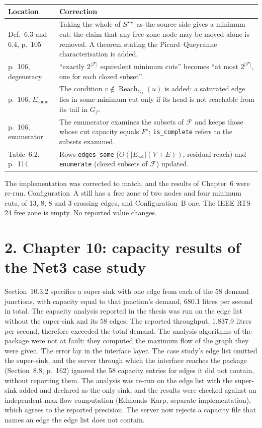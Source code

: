 \documentclass[11pt]{article}
\begin{document}
\begin{tabularx}{\linewidth}{@{}P{3.4cm}L@{}}
\toprule
Location & Correction \\
\midrule
Def.~6.3 and 6.4, p.~105 & Taking the whole of $S^{\star\star}$ as the source side gives a
minimum cut; the claim that any free-zone node may be moved alone is removed. A theorem
stating the Picard--Queyranne characterisation is added. \\
p.~106, degeneracy & ``exactly $2^{|\mathcal{F}|}$ equivalent minimum cuts'' becomes ``at most
$2^{|\mathcal{F}|}$, one for each closed subset''. \\
p.~106, $E_{\text{some}}$ & The condition $v \notin \operatorname{Reach}_{G_f}(u)$ is added: a
saturated edge lies in some minimum cut only if its head is not reachable from its tail in
$G_f$. \\
p.~106, enumerator & The enumerator examines the subsets of $\mathcal{F}$ and keeps those whose
cut capacity equals $F^\star$; \texttt{is\_complete} refers to the subsets examined. \\
Table~6.2, p.~114 & Rows \texttt{edges\_some} ($O(|E_{\text{sat}}|(V+E))$, residual reach) and
\texttt{enumerate} (closed subsets of $\mathcal{F}$) updated. \\
\bottomrule
\end{tabularx}

The implementation was corrected to match, and the results of Chapter~6 were re-run. Configuration~A still has a free zone of two nodes and four minimum
cuts, of 13, 8, 8 and 3 crossing edges, and Configuration~B one. The IEEE RTS-24 free zone is
empty. No reported value changes.

\section*{2. Chapter 10: capacity results of the Net3 case study}

Section~10.3.2 specifies a super-sink with one edge from each of the 58 demand junctions,
with capacity equal to that junction's demand, 680.1 litres per second in total. The
capacity analysis reported in the thesis was run on the edge list without the super-sink and
its 58 edges. The reported throughput, 1,837.9 litres per second, therefore exceeded the total
demand. The analysis algorithms of the package were not at fault: they computed the maximum
flow of the graph they were given. The error lay in the interface layer. The case study's
edge list omitted the super-sink, and the server through which the interface reaches the
package (Section~8.8, p.~162) ignored the 58 capacity entries for edges it did not contain,
without reporting them. The
analysis was re-run on the edge list with the super-sink added and declared as the only sink,
and the results were checked against an independent max-flow computation (Edmonds--Karp,
separate implementation), which agrees to the reported precision. The server now rejects a
capacity file that names an edge the edge list does not contain.
\end{document}
